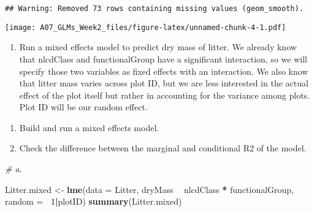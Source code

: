 \documentclass[]{article}
\newenvironment{Shaded}{\begin{snugshade}}{\end{snugshade}}
\newcommand{\KeywordTok}[1]{\textcolor[rgb]{0.13,0.29,0.53}{\textbf{#1}}}
\newcommand{\DataTypeTok}[1]{\textcolor[rgb]{0.13,0.29,0.53}{#1}}
\newcommand{\DecValTok}[1]{\textcolor[rgb]{0.00,0.00,0.81}{#1}}
\newcommand{\StringTok}[1]{\textcolor[rgb]{0.31,0.60,0.02}{#1}}
\newcommand{\CommentTok}[1]{\textcolor[rgb]{0.56,0.35,0.01}{\textit{#1}}}
\newcommand{\OperatorTok}[1]{\textcolor[rgb]{0.81,0.36,0.00}{\textbf{#1}}}
\newcommand{\NormalTok}[1]{#1}
\providecommand{\tightlist}{%
  \setlength{\itemsep}{0pt}\setlength{\parskip}{0pt}}
\begin{document}
\begin{verbatim}
## Warning: Removed 73 rows containing missing values (geom_smooth).
\end{verbatim}

\texttt{[image: A07\_GLMs\_Week2\_files/figure-latex/unnamed-chunk-4-1.pdf]}

\begin{enumerate}
\def\labelenumi{\arabic{enumi}.}
\setcounter{enumi}{8}
\tightlist
\item
  Run a mixed effects model to predict dry mass of litter. We already
  know that nlcdClass and functionalGroup have a significant
  interaction, so we will specify those two variables as fixed effects
  with an interaction. We also know that litter mass varies across plot
  ID, but we are less interested in the actual effect of the plot itself
  but rather in accounting for the variance among plots. Plot ID will be
  our random effect.
\end{enumerate}

\begin{enumerate}
\def\labelenumi{\alph{enumi}.}
\tightlist
\item
  Build and run a mixed effects model.
\item
  Check the difference between the marginal and conditional R2 of the
  model.
\end{enumerate}

\begin{Shaded}
\begin{Highlighting}[]
\CommentTok{# a. }

\NormalTok{Litter.mixed <-}\StringTok{ }\KeywordTok{lme}\NormalTok{(}\DataTypeTok{data =}\NormalTok{ Litter,}
\NormalTok{                     dryMass }\OperatorTok{~}\StringTok{ }\NormalTok{nlcdClass }\OperatorTok{*}\StringTok{ }\NormalTok{functionalGroup,  }
                     \DataTypeTok{random =} \OperatorTok{~}\DecValTok{1}\OperatorTok{|}\NormalTok{plotID) }
\KeywordTok{summary}\NormalTok{(Litter.mixed)}
\end{Highlighting}
\end{Shaded}
\end{document}
